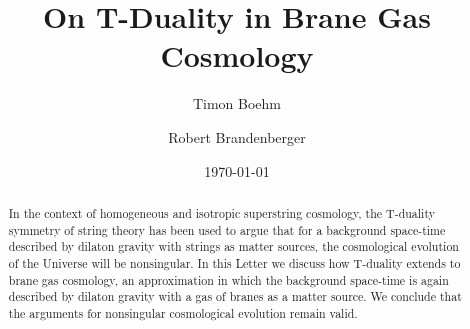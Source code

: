 \documentclass[a4paper,twocolumn,nofootinbib,tightenlines,prd,aps,
               superscriptaddress]{revtex4} %
\begin{document}


\title{On T-Duality in  Brane Gas Cosmology}

\author{Timon Boehm }




\author{Robert Brandenberger}



\date{\today}



\begin{abstract}
In the context of homogeneous and isotropic
superstring cosmology, the T-duality symmetry
of string theory has been used to argue that
for a background space-time described by dilaton gravity with
strings as matter sources, the cosmological evolution of the
Universe will be nonsingular. In this Letter we discuss how
T-duality extends to brane gas cosmology, an approximation in
which the background space-time is again described by dilaton
gravity with a gas of branes as a matter source. We conclude that
the arguments for nonsingular cosmological evolution remain valid.
\end{abstract}
\end{document}
